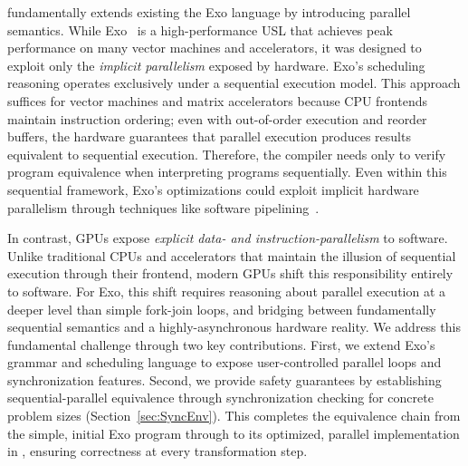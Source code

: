 
\sporkName{} fundamentally extends existing the Exo language by introducing parallel semantics.
While Exo~\cite{exo, exo2} is a high-performance USL that achieves peak performance on many vector machines and accelerators, it was designed to exploit only the \emph{implicit parallelism} exposed by hardware.
%
Exo's scheduling reasoning operates exclusively under a sequential execution model.
This approach suffices for vector machines and matrix accelerators because CPU frontends maintain instruction ordering; even with out-of-order execution and reorder buffers, the hardware guarantees that parallel execution produces results equivalent to sequential execution.
Therefore, the compiler needs only to verify program equivalence when interpreting programs sequentially.
Even within this sequential framework, Exo's optimizations could exploit implicit hardware parallelism through techniques like software pipelining~\cite{exo, exo2}.

In contrast, GPUs expose \emph{explicit data- and instruction-parallelism} to software.
Unlike traditional CPUs and accelerators that maintain the illusion of sequential execution through their frontend, modern GPUs shift this responsibility entirely to software.
%
For Exo, this shift requires reasoning about parallel execution at a deeper level than simple fork-join loops,
and bridging between fundamentally sequential semantics and a highly-asynchronous hardware reality.
%
We address this fundamental challenge through two key contributions. First, we extend Exo's grammar and scheduling language to expose user-controlled parallel loops and synchronization features.
Second, we provide safety guarantees by establishing sequential-parallel equivalence through synchronization checking for concrete problem sizes (Section~\ref{sec:SyncEnv}).
This completes the equivalence chain from the simple, initial Exo program through to its optimized, parallel implementation in \sporkName{}, ensuring correctness at every transformation step.
